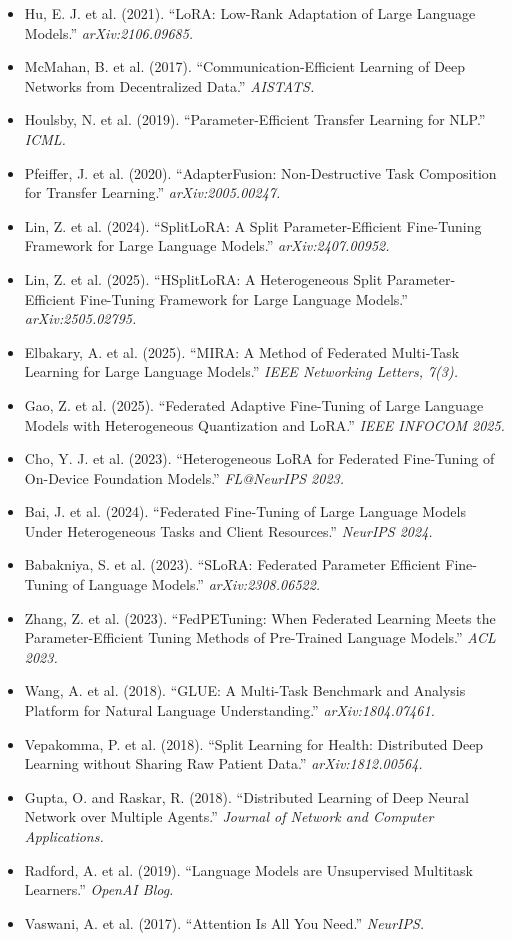 \documentclass[11pt,a4paper]{article}
\begin{document}
\begin{itemize}
\item Hu, E. J. et al. (2021). ``LoRA: Low-Rank Adaptation of Large Language Models.'' \emph{arXiv:2106.09685.}
\item McMahan, B. et al. (2017). ``Communication-Efficient Learning of Deep Networks from Decentralized Data.'' \emph{AISTATS.}
\item Houlsby, N. et al. (2019). ``Parameter-Efficient Transfer Learning for NLP.'' \emph{ICML.}
\item Pfeiffer, J. et al. (2020). ``AdapterFusion: Non-Destructive Task Composition for Transfer Learning.'' \emph{arXiv:2005.00247.}
\item Lin, Z. et al. (2024). ``SplitLoRA: A Split Parameter-Efficient Fine-Tuning Framework for Large Language Models.'' \emph{arXiv:2407.00952.}
\item Lin, Z. et al. (2025). ``HSplitLoRA: A Heterogeneous Split Parameter-Efficient Fine-Tuning Framework for Large Language Models.'' \emph{arXiv:2505.02795.}
\item Elbakary, A. et al. (2025). ``MIRA: A Method of Federated Multi-Task Learning for Large Language Models.'' \emph{IEEE Networking Letters, 7(3).}
\item Gao, Z. et al. (2025). ``Federated Adaptive Fine-Tuning of Large Language Models with Heterogeneous Quantization and LoRA.'' \emph{IEEE INFOCOM 2025.}
\item Cho, Y. J. et al. (2023). ``Heterogeneous LoRA for Federated Fine-Tuning of On-Device Foundation Models.'' \emph{FL@NeurIPS 2023.}
\item Bai, J. et al. (2024). ``Federated Fine-Tuning of Large Language Models Under Heterogeneous Tasks and Client Resources.'' \emph{NeurIPS 2024.}
\item Babakniya, S. et al. (2023). ``SLoRA: Federated Parameter Efficient Fine-Tuning of Language Models.'' \emph{arXiv:2308.06522.}
\item Zhang, Z. et al. (2023). ``FedPETuning: When Federated Learning Meets the Parameter-Efficient Tuning Methods of Pre-Trained Language Models.'' \emph{ACL 2023.}
\item Wang, A. et al. (2018). ``GLUE: A Multi-Task Benchmark and Analysis Platform for Natural Language Understanding.'' \emph{arXiv:1804.07461.}
\item Vepakomma, P. et al. (2018). ``Split Learning for Health: Distributed Deep Learning without Sharing Raw Patient Data.'' \emph{arXiv:1812.00564.}
\item Gupta, O. and Raskar, R. (2018). ``Distributed Learning of Deep Neural Network over Multiple Agents.'' \emph{Journal of Network and Computer Applications.}
\item Radford, A. et al. (2019). ``Language Models are Unsupervised Multitask Learners.'' \emph{OpenAI Blog.}
\item Vaswani, A. et al. (2017). ``Attention Is All You Need.'' \emph{NeurIPS.}
\end{itemize}
\end{document}
